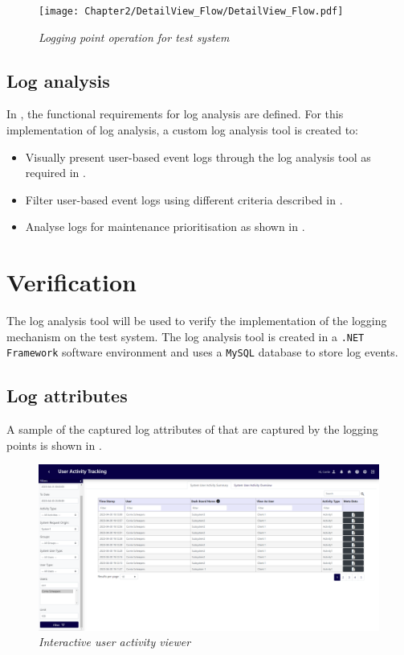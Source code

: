 \begin{figure}[!htb]
	\centering %
	\texttt{[image: Chapter2/DetailView\_Flow/DetailView\_Flow.pdf]}
	\caption[Logging point operation for test system]
	{\textit{Logging point operation for test system}}\label{fig:ch3_loggingProcess}
\end{figure}

\clearpage

\subsection{Log analysis}\label{sec:ch3_implementationLogAnalysis}
In , the functional requirements for log analysis are defined. For this implementation of log analysis, a custom log analysis tool is created to:

\begin{itemize}
	\item Visually present user-based event logs through the log analysis tool as required in .
	\item Filter user-based event logs using different criteria described in .
	\item Analyse logs for maintenance prioritisation as shown in .
\end{itemize}

\section{Verification}\label{sec:ch3_Verification}
The log analysis tool will be used to verify the implementation of the logging mechanism on the test system. The log analysis tool is created in a \texttt{.NET Framework} software environment and uses a \texttt{MySQL} database to store log events.

\subsection{Log attributes}
A sample of the captured log attributes of  that are captured by the logging points is shown in .

\begin{figure}[!htb]
	\centering %
	\includegraphics[width=0.99\linewidth]{img/ch3/analysis/UAT_menu.png}
	\caption[Interactive user activity viewer]
	{\textit{Interactive user activity viewer}}\label{fig:ch3_UAT_menu}
\end{figure}

